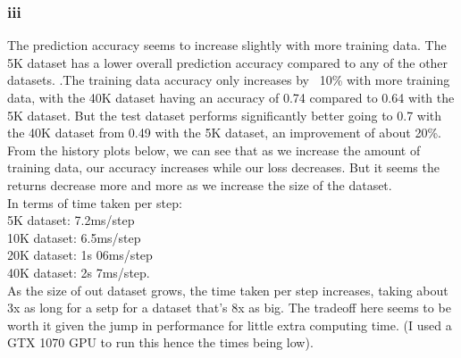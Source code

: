 \documentclass[11pt]{article} %
\begin{document}
\subsubsection{iii}
The prediction accuracy seems to increase slightly with more training data.  The 5K dataset has a lower overall prediction accuracy compared to any of the other datasets.  .The training data accuracy only increases by ~10\% with more training data, with the 40K dataset having an accuracy of 0.74 compared to 0.64 with the 5K dataset.  But the test dataset performs significantly better going to 0.7 with the 40K dataset from 0.49 with the 5K dataset,  an improvement of about 20\%.  From the history plots below, we can see that as we increase the amount of training data, our accuracy increases while our loss decreases.  But it seems the returns decrease more and more as we increase the size of the dataset.  \\
In terms of time taken per step: \\ 5K dataset: 7.2ms/step\\10K dataset: 6.5ms/step\\20K dataset: 1s 06ms/step\\40K dataset: 2s 7ms/step. \\
As the size of out dataset grows, the time taken per step increases, taking about 3x as long for a setp for a dataset that's 8x as big.  The tradeoff here seems to be worth it given the jump in performance for little extra computing time. (I used a GTX 1070 GPU to run this hence the times being low).
\end{document}
